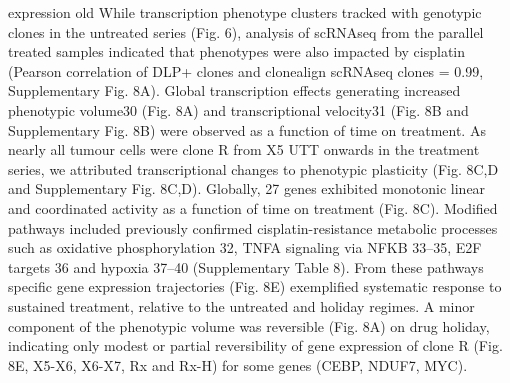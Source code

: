 
\fitness expression old
While transcription phenotype clusters tracked with genotypic clones in the untreated series     (Fig. 6), analysis of scRNAseq from the parallel treated samples indicated that phenotypes were     also impacted by cisplatin (Pearson correlation of DLP+ clones and clonealign  scRNAseq      clones  =  0.99,   Supplementary  Fig.  8A).  Global  transcription  effects  generating  increased phenotypic  volume30  (Fig.  8A)  and  transcriptional  velocity31  (Fig.  8B  and  Supplementary     Fig.  8B)  were  observed  as  a  function  of  time  on  treatment.	As  nearly  all  tumour  cells      were  clone  R  from  X5  UTT   onwards  in  the  treatment  series,  we  attributed  transcriptional     changes to phenotypic plasticity (Fig. 8C,D and Supplementary Fig. 8C,D). Globally, 27 genes     exhibited monotonic linear and coordinated activity as a function of time on treatment (Fig. 8C).     Modified pathways included previously confirmed cisplatin-resistance metabolic processes such      as oxidative phosphorylation 32, TNFA signaling via NFKB 33–35, E2F targets 36 and hypoxia 37–40     (Supplementary Table 8).  From these pathways specific gene expression trajectories (Fig. 8E)     exemplified systematic response to sustained treatment, relative to the untreated and holiday      regimes. A minor component of the phenotypic volume was reversible (Fig. 8A) on drug holiday,     indicating only modest or partial reversibility of gene expression of clone R (Fig. 8E, X5-X6, X6-X7, Rx and Rx-H) for some genes (CEBP, NDUF7, MYC).



